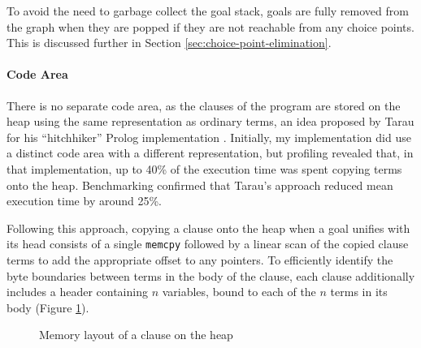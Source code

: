 To avoid the need to garbage collect the goal stack, goals are fully removed from the graph when they are popped if they are not reachable from any choice points. This is discussed further in Section \ref{sec:choice-point-elimination}.

\paragraph{Code Area} There is no separate code area, as the clauses of the program are stored on the heap using the same representation as ordinary terms, an idea proposed by Tarau for his ``hitchhiker'' Prolog implementation \cite{tarauHitchhikersGuideReinventing2018}. Initially, my implementation did use a distinct code area with a different representation, but profiling revealed that, in that implementation, up to 40\% of the execution time was spent copying terms onto the heap. Benchmarking confirmed that Tarau's approach reduced mean execution time by around 25\%.

Following this approach, copying a clause onto the heap when a goal unifies with its head consists of a single \texttt{memcpy} followed by a linear scan of the copied clause terms to add the appropriate offset to any pointers. To efficiently identify the byte boundaries between terms in the body of the clause, each clause additionally includes a header containing $n$ variables, bound to each of the $n$ terms in its body (Figure \ref{fig:clause-layout}).

\begin{figure}[H]
\centering
{}
\caption{Memory layout of a clause on the heap}
\label{fig:clause-layout}
\end{figure}

